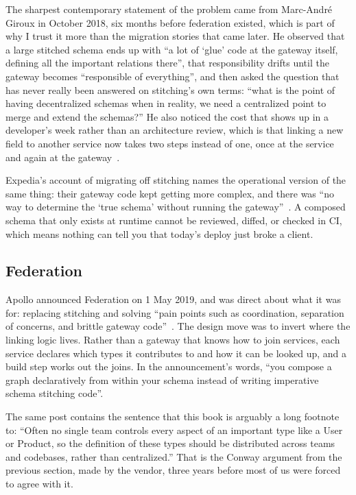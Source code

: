 The sharpest contemporary statement of the problem came from Marc-Andr\'e
Giroux in October 2018, six months before federation existed, which is part of
why I trust it more than the migration stories that came later. He observed
that a large stitched schema ends up with \enquote{a lot of `glue' code at the
gateway itself, defining all the important relations there}, that
responsibility drifts until the gateway becomes \enquote{responsible of
everything}, and then asked the question that has never really been answered on
stitching's own terms: \enquote{what is the point of having decentralized
schemas when in reality, we need a centralized point to merge and extend the
schemas?} He also noticed the cost that shows up in a developer's week rather
than an architecture review, which is that linking a new field to another
service now takes two steps instead of one, once at the service and again at
the gateway~\autocite{giroux2018stitching}.

Expedia's account of migrating off stitching names the operational version of
the same thing: their gateway code kept getting more complex, and there was
\enquote{no way to determine the `true schema' without running the
gateway}~\autocite{isquick2021expedia}. A composed schema that only exists at
runtime cannot be reviewed, diffed, or checked in CI, which means nothing can
tell you that today's deploy just broke a client.

\subsection*{Federation}
%

Apollo announced Federation on 1 May 2019, and was direct about what it was
for: replacing stitching and solving \enquote{pain points such as coordination,
separation of concerns, and brittle gateway code}~\autocite{baxley2019federation}.
The design move was to invert where the linking logic lives. Rather than a
gateway that knows how to join services, each service declares which types it
contributes to and how it can be looked up, and a build step works out the
joins. In the announcement's words, \enquote{you compose a graph declaratively
from within your schema instead of writing imperative schema stitching code}.

The same post contains the sentence that this book is arguably a long footnote
to: \enquote{Often no single team controls every aspect of an important type
like a User or Product, so the definition of these types should be distributed
across teams and codebases, rather than centralized.} That is the Conway
argument from the previous section, made by the vendor, three years before most
of us were forced to agree with it.

